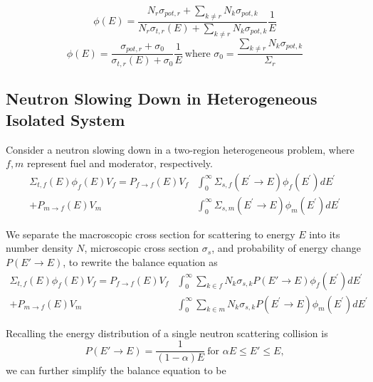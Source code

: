\documentclass[10pt]{article}
\begin{document}
\begin{equation}\phi(E)=\frac{N_{r}\sigma_{pot,r}+\sum\limits_{k\neq r}N_{k}\sigma_{pot,k}}{N_{r}\sigma_{t,r}(E)+\sum\limits_{k\neq r}N_{k}\sigma_{pot,k}}\frac{1}{E}\end{equation}
\begin{equation}\boxed{\phi(E)=\frac{\sigma_{pot,r}+\sigma_{0}}{\sigma_{t,r}(E)+\sigma_{0}}\frac{1}{E}~\mbox{where }\sigma_0=\frac{\sum\limits_{k\neq r}N_k\sigma_{pot,k}}{\Sigma_r}}\end{equation}






\subsection*{Neutron Slowing Down in Heterogeneous Isolated System}
Consider a neutron slowing down in a two-region heterogeneous problem, where $f,m$ represent fuel and moderator, respectively.
\begin{align}\Sigma_{t,f}(E)\phi_{f}(E)V_{f}=P_{f\rightarrow f}(E)V_{f}&\int_{0}^{\infty}\Sigma_{s,f}\left(E^{\prime}\rightarrow E\right)\phi_{f}\left(E^{\prime}\right)dE^{\prime}\\ + P_{m\rightarrow f}(E)V_{m}&\int_{0}^{\infty}\Sigma_{s,m}\left(E^{\prime}\rightarrow E\right)\phi_{m}\left(E^{\prime}\right)dE^{\prime}\end{align}

We separate the macroscopic cross section for scattering to energy $E$ into its number density $N$, microscopic cross section $\sigma_s$, and probability of energy change $P(E'\rightarrow E)$, to rewrite the balance equation as 
\begin{align}\Sigma_{t,f}(E)\phi_{f}(E)V_{f}=P_{f\rightarrow f}(E)V_{f}&\int_{0}^{\infty}\sum\limits_{k\in f}N_k\sigma_{s,k}P(E'\rightarrow E)\phi_{f}\left(E^{\prime}\right)dE^{\prime}\\ + P_{m\rightarrow f}(E)V_{m}&\int_{0}^{\infty}\sum\limits_{k\in m}N_k\sigma_{s,k}P\left(E^{\prime}\rightarrow E\right)\phi_{m}\left(E^{\prime}\right)dE^{\prime}\end{align}

Recalling the energy distribution of a single neutron scattering collision is 
\begin{equation}P(E'\rightarrow E)=\frac{1}{(1-\alpha)E}~\mbox{for }\alpha E\leq E'\leq E,\end{equation}
we can further simplify the balance equation to be
\end{document}
